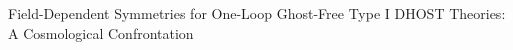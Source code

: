 \documentclass[twocolumn]{aastex631}
\begin{document}
Field-Dependent Symmetries for One-Loop Ghost-Free Type I DHOST Theories: A Cosmological Confrontation
\end{document}
